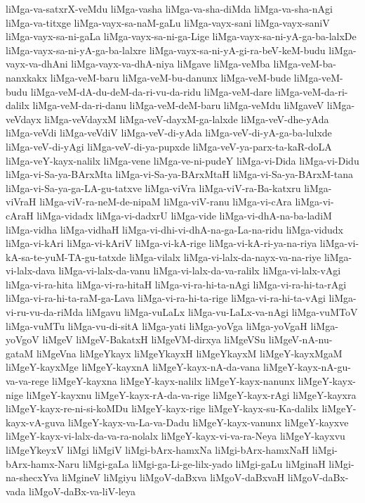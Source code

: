 {liMga-va-satxrX-veMdu
liMga-vasha
liMga-va-sha-diMda
liMga-va-sha-nAgi
liMga-va-titxge
liMga-vayx-sa-naM-gaLu
liMga-vayx-sani
liMga-vayx-saniV
liMga-vayx-sa-ni-gaLa
liMga-vayx-sa-ni-ga-Lige
liMga-vayx-sa-ni-yA-ga-ba-lalxDe
liMga-vayx-sa-ni-yA-ga-ba-lalxre
liMga-vayx-sa-ni-yA-gi-ra-beV-keM-budu
liMga-vayx-va-dhAni
liMga-vayx-va-dhA-niya
liMgave
liMga-veMba
liMga-veM-ba-nanxkakx
liMga-veM-baru
liMga-veM-bu-danunx
liMga-veM-bude
liMga-veM-budu
liMga-veM-dA-du-deM-da-ri-vu-da-ridu
liMga-veM-dare
liMga-veM-da-ri-dalilx
liMga-veM-da-ri-danu
liMga-veM-deM-baru
liMga-veMdu
liMgaveV
liMga-veVdayx
liMga-veVdayxM
liMga-veV-dayxM-ga-lalxde
liMga-veV-dhe-yAda
liMga-veVdi
liMga-veVdiV
liMga-veV-di-yAda
liMga-veV-di-yA-ga-ba-lulxde
liMga-veV-di-yAgi
liMga-veV-di-ya-pupxde
liMga-veV-ya-parx-ta-kaR-doLA
liMga-veY-kayx-nalilx
liMga-vene
liMga-ve-ni-pudeY
liMga-vi-Dida
liMga-vi-Didu
liMga-vi-Sa-ya-BArxMta
liMga-vi-Sa-ya-BArxMtaH
liMga-vi-Sa-ya-BArxM-tana
liMga-vi-Sa-ya-ga-LA-gu-tatxve
liMga-viVra
liMga-viV-ra-Ba-katxru
liMga-viVraH
liMga-viV-ra-neM-de-nipaM
liMga-viV-ranu
liMga-vi-cAra
liMga-vi-cAraH
liMga-vidadx
liMga-vi-dadxrU
liMga-vide
liMga-vi-dhA-na-ba-ladiM
liMga-vidha
liMga-vidhaH
liMga-vi-dhi-vi-dhA-na-ga-La-na-ridu
liMga-vidudx
liMga-vi-kAri
liMga-vi-kAriV
liMga-vi-kA-rige
liMga-vi-kA-ri-ya-na-riya
liMga-vi-kA-sa-te-yuM-TA-gu-tatxde
liMga-vilalx
liMga-vi-lalx-da-nayx-va-na-riye
liMga-vi-lalx-dava
liMga-vi-lalx-da-vanu
liMga-vi-lalx-da-va-ralilx
liMga-vi-lalx-vAgi
liMga-vi-ra-hita
liMga-vi-ra-hitaH
liMga-vi-ra-hi-ta-nAgi
liMga-vi-ra-hi-ta-rAgi
liMga-vi-ra-hi-ta-raM-ga-Lava
liMga-vi-ra-hi-ta-rige
liMga-vi-ra-hi-ta-vAgi
liMga-vi-ru-vu-da-riMda
liMgavu
liMga-vuLaLx
liMga-vu-LaLx-va-nAgi
liMga-vuMToV
liMga-vuMTu
liMga-vu-di-sitA
liMga-yati
liMga-yoVga
liMga-yoVgaH
liMga-yoVgoV
liMgeV
liMgeV-BakatxH
liMgeVM-dirxya
liMgeVSu
liMgeV-nA-nu-gataM
liMgeVna
liMgeYkayx
liMgeYkayxH
liMgeYkayxM
liMgeY-kayxMgaM
liMgeY-kayxMge
liMgeY-kayxnA
liMgeY-kayx-nA-da-vana
liMgeY-kayx-nA-gu-va-va-rege
liMgeY-kayxna
liMgeY-kayx-nalilx
liMgeY-kayx-nanunx
liMgeY-kayx-nige
liMgeY-kayxnu
liMgeY-kayx-rA-da-va-rige
liMgeY-kayx-rAgi
liMgeY-kayxra
liMgeY-kayx-re-ni-si-koMDu
liMgeY-kayx-rige
liMgeY-kayx-su-Ka-dalilx
liMgeY-kayx-vA-guva
liMgeY-kayx-va-La-va-Dadu
liMgeY-kayx-vanunx
liMgeY-kayxve
liMgeY-kayx-vi-lalx-da-va-ra-nolalx
liMgeY-kayx-vi-va-ra-Neya
liMgeY-kayxvu
liMgeYkeyxV
liMgi
liMgiV
liMgi-bArx-hamxNa
liMgi-bArx-hamxNaH
liMgi-bArx-hamx-Naru
liMgi-gaLa
liMgi-ga-Li-ge-lilx-yado
liMgi-gaLu
liMginaH
liMgi-na-shecxYva
liMgineV
liMgiyu
liMgoV-daBxva
liMgoV-daBxvaH
liMgoV-daBx-vada
liMgoV-daBx-va-liV-leya
}
